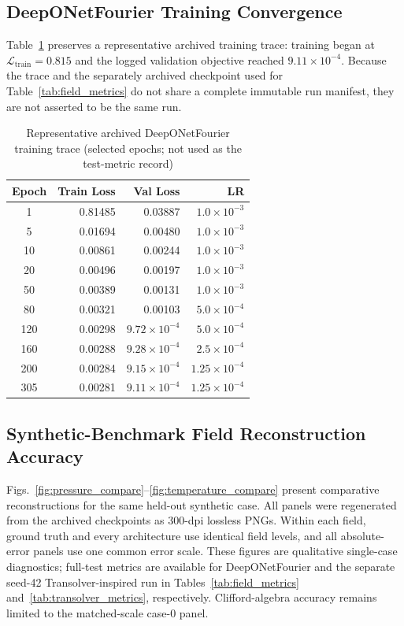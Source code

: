\documentclass[journal]{IEEEtran}
\newcommand{\added}[1]{#1}
\begin{document}
\subsection{DeepONetFourier Training Convergence}

\added{Table~\ref{tab:loss_history} preserves a representative archived training trace: training began at $\mathcal{L}_\text{train}=0.815$ and the logged validation objective reached $9.11\times10^{-4}$. Because the trace and the separately archived checkpoint used for Table~\ref{tab:field_metrics} do not share a complete immutable run manifest, they are not asserted to be the same run.}

\begin{table}[htbp]
\caption{\added{Representative archived DeepONetFourier training trace (selected epochs; not used as the test-metric record)}}
\label{tab:loss_history}
\centering
\begin{tabular}{crrr}
\toprule
\textbf{Epoch} & \textbf{Train Loss} & \textbf{Val Loss} & \textbf{LR} \\
\midrule
1   & 0.81485 & 0.03887 & $1.0{\times}10^{-3}$ \\
5   & 0.01694 & 0.00480 & $1.0{\times}10^{-3}$ \\
10  & 0.00861 & 0.00244 & $1.0{\times}10^{-3}$ \\
20  & 0.00496 & 0.00197 & $1.0{\times}10^{-3}$ \\
50  & 0.00389 & 0.00131 & $1.0{\times}10^{-3}$ \\
80  & 0.00321 & 0.00103 & $5.0{\times}10^{-4}$ \\
120 & 0.00298 & $9.72{\times}10^{-4}$ & $5.0{\times}10^{-4}$ \\
160 & 0.00288 & $9.28{\times}10^{-4}$ & $2.5{\times}10^{-4}$ \\
200 & 0.00284 & $9.15{\times}10^{-4}$ & $1.25{\times}10^{-4}$ \\
305 & 0.00281 & $9.11{\times}10^{-4}$ & $1.25{\times}10^{-4}$ \\
\bottomrule
\end{tabular}
\end{table}

\subsection{Synthetic-Benchmark Field Reconstruction Accuracy}

Figs.~\ref{fig:pressure_compare}--\ref{fig:temperature_compare} present comparative reconstructions for the same held-out synthetic case.  \added{All panels were regenerated from the archived checkpoints as 300-dpi lossless PNGs. Within each field, ground truth and every architecture use identical field levels, and all absolute-error panels use one common error scale. These figures are qualitative single-case diagnostics; full-test metrics are available for DeepONetFourier and the separate seed-42 Transolver-inspired run in Tables~\ref{tab:field_metrics} and~\ref{tab:transolver_metrics}, respectively. Clifford-algebra accuracy remains limited to the matched-scale case-0 panel.}
\end{document}
